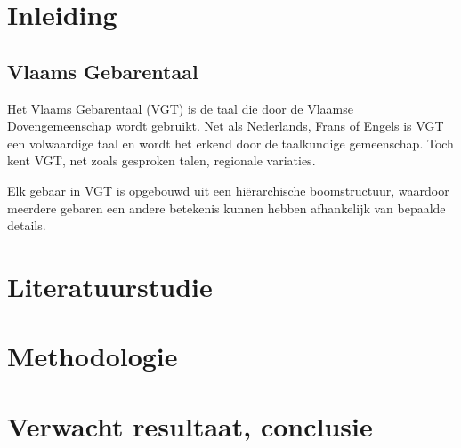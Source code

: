 


% 
\section{Inleiding}%
\label{sec:inleiding}

\subsection{Vlaams Gebarentaal}
\label{sec:VGT}

Het Vlaams Gebarentaal (VGT) is de taal die door de Vlaamse Dovengemeenschap wordt gebruikt. Net als Nederlands, Frans of Engels is VGT een volwaardige taal en wordt het erkend door de taalkundige gemeenschap.\autocite{vanmeerbergen2000simultane} Toch kent VGT, net zoals gesproken talen, regionale variaties.\autocite{10.1093/ijl/ecy008}

Elk gebaar in VGT is opgebouwd uit een hiërarchische boomstructuur, waardoor meerdere gebaren een andere betekenis kunnen hebben afhankelijk van bepaalde details.\autocite{469340}

\section{Literatuurstudie}%
\label{sec:literatuurstudie}


\section{Methodologie}%
\label{sec:methodologie}


\section{Verwacht resultaat, conclusie}%
\label{sec:verwachte_resultaten}
